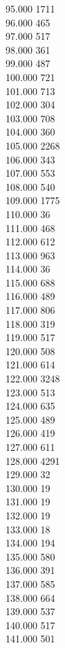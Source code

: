 { 95.000	1711 \\
 96.000	465 \\
 97.000	517 \\
 98.000	361 \\
 99.000	487 \\
 100.000	721 \\
 101.000	713 \\
 102.000	304 \\
 103.000	708 \\
 104.000	360 \\
 105.000	2268 \\
 106.000	343 \\
 107.000	553 \\
 108.000	540 \\
 109.000	1775 \\
 110.000	36 \\
 111.000	468 \\
 112.000	612 \\
 113.000	963 \\
 114.000	36 \\
 115.000	688 \\
 116.000	489 \\
 117.000	806 \\
 118.000	319 \\
 119.000	517 \\
 120.000	508 \\
 121.000	614 \\
 122.000	3248 \\
 123.000	513 \\
 124.000	635 \\
 125.000	489 \\
 126.000	419 \\
 127.000	611 \\
 128.000	4291 \\
 129.000	32 \\
 130.000	19 \\
 131.000	19 \\
 132.000	19 \\
 133.000	18 \\
 134.000	194 \\
 135.000	580 \\
 136.000	391 \\
 137.000	585 \\
 138.000	664 \\
 139.000	537 \\
 140.000	517 \\
 141.000	501 \\
}
